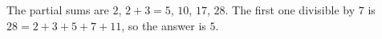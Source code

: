 The partial sums are $2$, $2+3=5$, $10$, $17$, $28$. The first one divisible by $7$ is $28=2+3+5+7+11$, so the answer is $\boxed{5}$.
